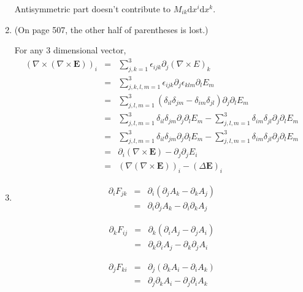 \documentclass[12pt,a4paper]{article}
\begin{document}
\begin{enumerate}
Antisymmetric part doesn't contribute to $M_{ik}\mathrm dx^i\mathrm dx^k$.






\item

{\color{red}(On page 507, the other half of parentheses is lost.)}

For any 3 dimensional vector, 
\begin{eqnarray}
	(\nabla\times(\nabla\times \mathbf E))_i&=&\sum_{j,k=1}^3\epsilon_{ijk}\partial_j(\nabla\times E)_k \\
	 &=& \sum_{j,k,l,m=1}^3 \epsilon_{ijk}\partial_j\epsilon_{klm}\partial_l E_m \\
	 &=&\sum_{j,l,m=1}^3 (\delta_{il}\delta_{jm} - \delta_{im}\delta_{jl})\partial_j\partial_l E_m \\
	 &=&\sum_{j,l,m=1}^3 \delta_{il}\delta_{jm}\partial_j\partial_l E_m  - \sum_{j,l,m=1}^3 \delta_{im}\delta_{jl}\partial_j\partial_l E_m \\
	 &=&\sum_{j,l,m=1}^3 \delta_{il}\delta_{jm}\partial_j\partial_l E_m  - \sum_{j,l,m=1}^3 \delta_{im}\delta_{jl}\partial_j\partial_l E_m \\
	 &=&\partial_i(\nabla\times \mathbf E) - \partial_j\partial_j E_i \\
	 &=&(\nabla(\nabla\times \mathbf E))_i - (\Delta \mathbf E)_i
\end{eqnarray}





\item

\begin{eqnarray}
	\partial_i F_{jk} &=& \partial_i (\partial_j A_k - \partial_k A_j) \\
	&=& \partial_i\partial_j A_k - \partial_i\partial_k A_j
\end{eqnarray}


\begin{eqnarray}
	\partial_k F_{ij} &=& \partial_k (\partial_i A_j - \partial_j A_i) \\
	&=& \partial_k\partial_i A_j - \partial_k\partial_j A_i
\end{eqnarray}

\begin{eqnarray}
	\partial_j F_{ki} &=& \partial_j (\partial_k A_i - \partial_i A_k) \\
	&=& \partial_j\partial_k A_i - \partial_j\partial_i A_k
\end{eqnarray}



\end{enumerate}
\end{document}
